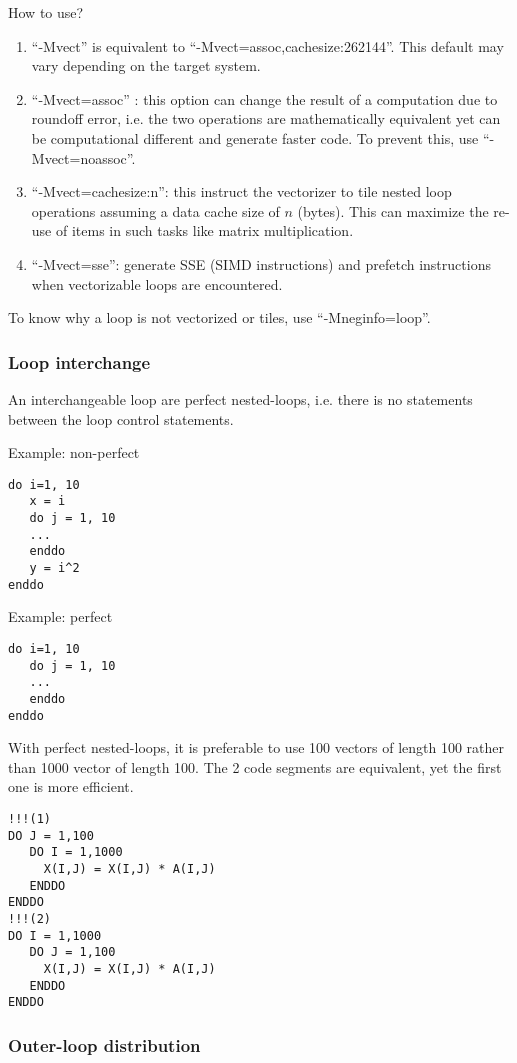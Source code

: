 How to use?
\begin{enumerate}
\item ``-Mvect'' is equivalent to
  ``-Mvect=assoc,cachesize:262144''. This default may vary depending
  on the target system.
\item ``-Mvect=assoc'' : this option can change the result of a
  computation due to roundoff error, i.e. the two operations are
  mathematically equivalent yet can be computational different and
  generate faster code. To prevent this, use ``-Mvect=noassoc''.
\item ``-Mvect=cachesize:n'': this instruct the vectorizer to tile
  nested loop operations assuming a data cache size of $n$
  (bytes). This can maximize the re-use of items in such tasks like
  matrix multiplication. 
\item ``-Mvect=sse'': generate SSE (SIMD instructions) and prefetch
  instructions when vectorizable loops are encountered. 
\end{enumerate}

To know why a loop is not vectorized or tiles, use ``-Mneginfo=loop''.

\subsubsection{Loop interchange}
\label{sec:loop-interchange}

An interchangeable loop are perfect nested-loops, i.e. there is no
statements between the loop control statements.

Example: non-perfect
\begin{lstlisting}
do i=1, 10
   x = i
   do j = 1, 10
   ...
   enddo
   y = i^2
enddo
\end{lstlisting}
Example: perfect 
\begin{lstlisting}
do i=1, 10
   do j = 1, 10
   ...
   enddo
enddo
\end{lstlisting}

With perfect nested-loops, it is preferable to use 100 vectors of
length 100 rather than 1000 vector of length 100. The 2 code segments
are equivalent, yet the first one is more efficient.
\begin{lstlisting}
!!!(1)
DO J = 1,100
   DO I = 1,1000
     X(I,J) = X(I,J) * A(I,J)
   ENDDO
ENDDO
!!!(2)
DO I = 1,1000
   DO J = 1,100
     X(I,J) = X(I,J) * A(I,J)
   ENDDO
ENDDO
\end{lstlisting}

\subsubsection{Outer-loop distribution}
\label{sec:outer-loop-distr}

